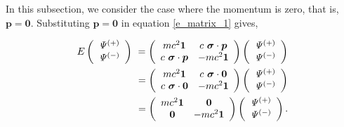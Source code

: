 \documentclass[%
 reprint,
 amsmath,amssymb,
 aps,
]{revtex4-1}
\numberwithin{equation}{section}%
\begin{document}
    In this subsection, we consider the case where the momentum is zero, that is, $ \bm{p} = \bm{0} $. Substituting $ \bm{p} = \bm{0} $ in equation \ref{e_matrix_1} gives,
    
        
        \begin{align}
            E
            \left( 
                \begin{array}{c}
                    \it\Psi^{(+)} \\ \it\Psi^{(-)}
                \end{array}
            \right) \
            =
            \left(
                \begin{array}{cc}
                    m c^2 \bm{1} 
                        & c \ \bm{\sigma} \cdot \bm{p} \\
                    c \ \bm{\sigma} \cdot \bm{p}
                        & - m c^2 \bm{1} \end{array}
            \right)
            \left(
                \begin{array}{c}
                    \it\Psi^{(+)} \\ \it\Psi^{(-)}
                \end{array}
            \right)
            \notag
            \\
            =
            \left(
                \begin{array}{cc}
                    m c^2 \bm{1} 
                        & c \ \bm{\sigma} \cdot \bm{0} \\
                    c \ \bm{\sigma} \cdot \bm{0}
                        & - m c^2 \bm{1} \end{array}
            \right)
            \left(
                \begin{array}{c}
                    \it\Psi^{(+)} \\ \it\Psi^{(-)}
                \end{array}
            \right)
            \notag
            \\
            =
            \left(
                \begin{array}{cc}
                    m c^2 \bm{1} 
                        & \bm{0} \\
                    \bm{0}
                        & - m c^2 \bm{1} \end{array}
            \right)
            \left(
                \begin{array}{c}
                    \it\Psi^{(+)} \\ \it\Psi^{(-)}
                \end{array}
            \right)
        .
        \label{e_matrix_3}
        \end{align}
\end{document}
